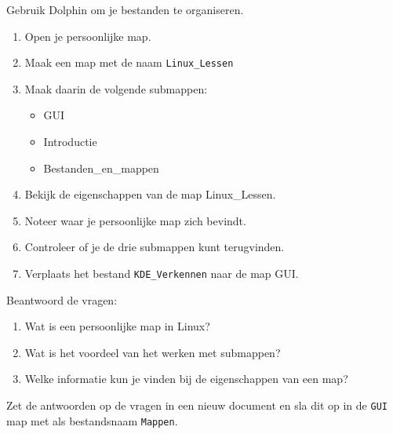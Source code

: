 Gebruik Dolphin om je bestanden te organiseren.
\begin{enumerate}
\item Open je persoonlijke map.
\item Maak een map met de naam \texttt{Linux\_Lessen}
\item Maak daarin de volgende submappen:
	\begin{itemize}
        \item GUI
        \item Introductie
        \item Bestanden\_en\_mappen
	\end{itemize}
\item Bekijk de eigenschappen van de map Linux\_Lessen.
\item Noteer waar je persoonlijke map zich bevindt.
\item Controleer of je de drie submappen kunt terugvinden.
\item Verplaats het bestand \texttt{KDE\_Verkennen} naar de map GUI.
\end{enumerate}

Beantwoord de vragen:
\begin{enumerate}
\item Wat is een persoonlijke map in Linux?
\item Wat is het voordeel van het werken met submappen?
\item Welke informatie kun je vinden bij de eigenschappen van een map?
\end{enumerate}

Zet de antwoorden op de vragen in een nieuw document en sla dit op in de \texttt{GUI} map met als bestandsnaam \texttt{Mappen}.

